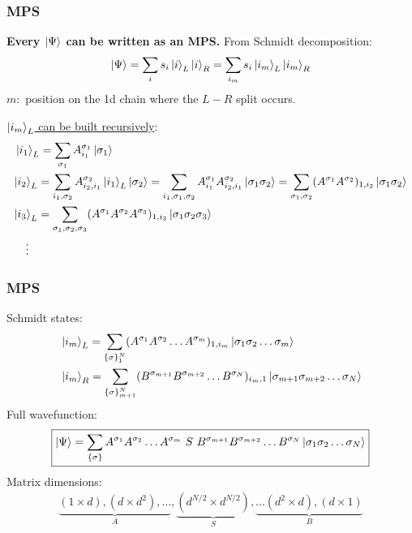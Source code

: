 \documentclass{beamer}
\theoremstyle{definition}
\begin{document}
\begin{frame}
	\frametitle{MPS}
	\textbf{Every $\ket{\Psi}$ can be written as an MPS.} From Schmidt decomposition:
	\begin{align*}
		\ket{\Psi} = \sum_{i} s_i \ket{i}_L \ket{i}_R = \sum_{i_m} s_i \ket{i_m}_L \ket{i_m}_R
	\end{align*}
	$m:$ position on the 1d chain where the $L-R$ split occurs. \\
	
	\vspace{15pt}
	
	\underline{$\ket{i_m}_L$ can be built recursively}:
	\begin{align*}
		&\ket{i_1}_L = \sum_{\sigma_1}A^{\sigma_1}_{i_1}\ket{\sigma_1}\\ 
		&\textcolor{black}{\ket{i_2}_L = \sum_{i_1,\sigma_2} A^{\sigma_2}_{i_2,i_1}  \ket{i_1}_L \ket{\sigma_2} = \sum_{i_1,\sigma_1,\sigma_2} A^{\sigma_1}_{i_1}   A^{\sigma_2}_{i_2,i_1} \ket{\sigma_1\sigma_2} = \sum_{\sigma_1,\sigma_2} (A^{\sigma_1}A^{\sigma_2})_{1,i_2} \ket{\sigma_1\sigma_2}}\\
		&\textcolor{black}{\ket{i_3}_L = \sum_{\sigma_1,\sigma_2,\sigma_3}(A^{\sigma_1}A^{\sigma_2}A^{\sigma_3})_{1,i_3} \ket{\sigma_1\sigma_2\sigma_3}}\\
		&\textcolor{black}{\quad\vdots}
	\end{align*}
\end{frame}





\begin{frame}
	\frametitle{MPS}
	Schmidt states:
	\begin{align*}
		&\ket{i_m}_L = \sum_{\{\sigma\}_1^N} (A^{\sigma_1}A^{\sigma_2}\dots A^{\sigma_m})_{1,i_m}  \ket{\sigma_1 \sigma_2\dots\sigma_m} \\
		&\ket{i_m}_R = \sum_{\{\sigma\}_{m+1}^N} (B^{\sigma_{m+1}}B^{\sigma_{m+2}}\dots B^{\sigma_N})_{i_m,1}  \ket{\sigma_{m+1}\sigma_{m+2}\dots\sigma_N} 
	\end{align*}
	\pause
	Full wavefunction:
	\begin{align*}
		\boxed{\ket{\Psi} = \sum_{\{\sigma\}}    A^{\sigma_1}A^{\sigma_2}\dots A^{\sigma_m}  \,\,{S}\,\, B^{\sigma_{m+1}}B^{\sigma_{m+2}}\dots B^{\sigma_N}  \ket{\sigma_1\sigma_2\dots \sigma_N}}
	\end{align*}
	Matrix dimensions:
	\begin{align*}
		\underbrace{(1\times d), (d\times d^2), \dots }_{A}, \underbrace{(d^{N/2}\times d^{N/2})}_{S},  \underbrace{\dots (d^2\times d), (d\times 1)}_{B}
	\end{align*}


\end{frame}
\end{document}
